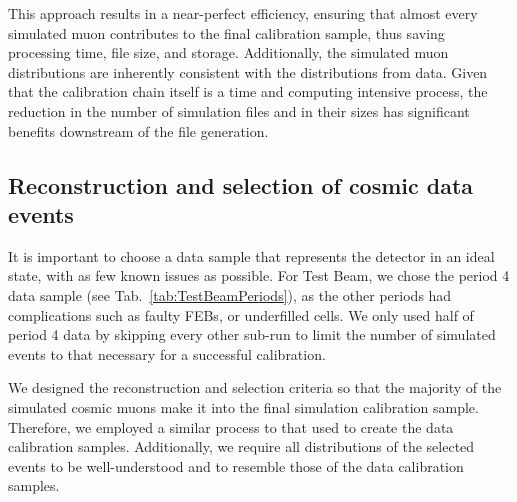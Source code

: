 This approach results in a near-perfect efficiency, ensuring that almost every simulated muon contributes to the final calibration sample, thus saving processing time, file size, and storage. Additionally, the simulated muon distributions are inherently consistent with the distributions from data. Given that the calibration chain itself is a time and computing intensive process, the reduction in the number of simulation files and in their sizes has significant benefits downstream of the file generation. 

\subsection{Reconstruction and selection of cosmic data events}\label{sec:CosmicGenAna}
It is important to choose a data sample that represents the detector in an ideal state, with as few known issues as possible. For Test Beam, we chose the period 4 data sample (see Tab.~\ref{tab:TestBeamPeriods}), as the other periods had complications such as faulty \glspl{FEB}, or underfilled cells. We only used half of period 4 data by skipping every other sub-run to limit the number of simulated events to that necessary for a successful calibration.


We designed the reconstruction and selection criteria so that the majority of the simulated cosmic muons make it into the final simulation calibration sample. Therefore, we employed a similar process to that used to create the data calibration samples. Additionally, we require all distributions of the selected events to be well-understood and to resemble those of the data calibration samples.

